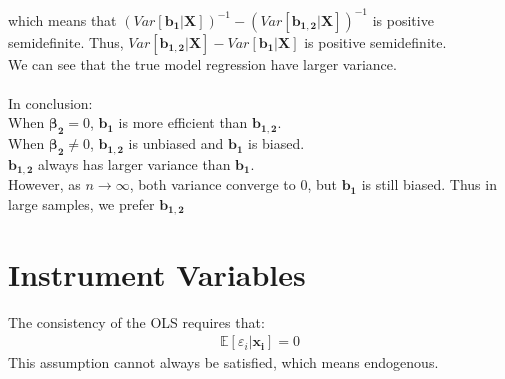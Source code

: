 \documentclass{article}
\begin{document}
which means that $(Var[\boldsymbol{b_1} | \boldsymbol{X}])^{-1} - (Var[\boldsymbol{b_{1, 2}} | \boldsymbol{X}])^{-1}$ is positive semidefinite. Thus, $	Var[\boldsymbol{b_{1,2}} | \boldsymbol{X}] - Var[\boldsymbol{b_1} | \boldsymbol{X}]$ is positive semidefinite.\\
We can see that the true model regression have larger variance.\\\\
In conclusion:\\
\indent When $\boldsymbol{\beta_2} = 0$, $\boldsymbol{b_1}$ is more efficient than $\boldsymbol{b_{1,2}}$.\\
\indent When $\boldsymbol{\beta_2} \neq 0$, $\boldsymbol{b_{1,2}}$ is unbiased and $\boldsymbol{b_1}$ is biased.\\
\indent $\boldsymbol{b_{1,2}}$ always has larger variance than $\boldsymbol{b_1}$.\\
However, as $n \to \infty$, both variance converge to 0, but $\boldsymbol{b_1}$ is still biased. Thus in large samples, we prefer $\boldsymbol{b_{1,2}}$



\newpage
\section{Instrument Variables}
The consistency of the OLS requires that:
	\begin{align*}
		\mathbb{E} [\varepsilon_i | \boldsymbol{x_i}] = 0
	\end{align*}
This assumption cannot always be satisfied, which means endogenous.
\end{document}
